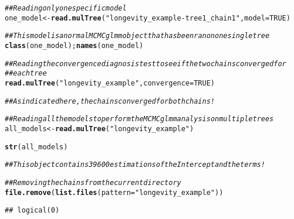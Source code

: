 \documentclass{article}\usepackage[]{graphicx}\usepackage[]{color}
\makeatletter
\newcommand{\hlnum}[1]{\textcolor[rgb]{0.686,0.059,0.569}{#1}}%
\newcommand{\hlstr}[1]{\textcolor[rgb]{0.192,0.494,0.8}{#1}}%
\newcommand{\hlcom}[1]{\textcolor[rgb]{0.678,0.584,0.686}{\textit{#1}}}%
\newcommand{\hlstd}[1]{\textcolor[rgb]{0.345,0.345,0.345}{#1}}%
\newcommand{\hlkwb}[1]{\textcolor[rgb]{0.69,0.353,0.396}{#1}}%
\newcommand{\hlkwc}[1]{\textcolor[rgb]{0.333,0.667,0.333}{#1}}%
\newcommand{\hlkwd}[1]{\textcolor[rgb]{0.737,0.353,0.396}{\textbf{#1}}}%
\newenvironment{kframe}{%
 \def\at@end@of@kframe{}%
 \ifinner\ifhmode%
  \def\at@end@of@kframe{\end{minipage}}%
  \begin{minipage}{\columnwidth}%
 \fi\fi%
 \def\FrameCommand##1{\hskip\@totalleftmargin \hskip-\fboxsep
 \colorbox{shadecolor}{##1}\hskip-\fboxsep
     \hskip-\linewidth \hskip-\@totalleftmargin \hskip\columnwidth}%
 \MakeFramed {\advance\hsize-\width
   \@totalleftmargin\z@ \linewidth\hsize
   \@setminipage}}%
 {\par\unskip\endMakeFramed%
 \at@end@of@kframe}
\newenvironment{knitrout}{}{} %
\makeatother
\begin{document}
\begin{knitrout}
\color{fgcolor}\begin{kframe}
\begin{alltt}
\hlcom{## Reading only one specific model}
\hlstd{one_model} \hlkwb{<-} \hlkwd{read.mulTree}\hlstd{(}\hlstr{"longevity_example-tree1_chain1"}\hlstd{,} \hlkwc{model} \hlstd{=} \hlnum{TRUE}\hlstd{)}
\end{alltt}


{\ttfamily\noindent\bfseries{}}\begin{alltt}
\hlcom{## This model is a normal MCMCglmm object that has been ran on one single tree}
\hlkwd{class}\hlstd{(one_model) ;} \hlkwd{names}\hlstd{(one_model)}
\end{alltt}


{\ttfamily\noindent\bfseries\color{errorcolor}{\#\# Error in eval(expr, envir, enclos): object 'one\_model' not found}}

{\ttfamily\noindent\bfseries\color{errorcolor}{\#\# Error in eval(expr, envir, enclos): object 'one\_model' not found}}\begin{alltt}
\hlcom{## Reading the convergence diagnosis test to see if the two chains converged for}
\hlcom{## each tree}
\hlkwd{read.mulTree}\hlstd{(}\hlstr{"longevity_example"}\hlstd{,} \hlkwc{convergence} \hlstd{=} \hlnum{TRUE}\hlstd{)}
\end{alltt}


{\ttfamily\noindent\bfseries{}}\begin{alltt}
\hlcom{## As indicated here, the chains converged for both chains!}

\hlcom{## Reading all the models to perform the MCMCglmm analysis on multiple trees}
\hlstd{all_models} \hlkwb{<-} \hlkwd{read.mulTree}\hlstd{(}\hlstr{"longevity_example"}\hlstd{)}
\end{alltt}


{\ttfamily\noindent\bfseries{}}\begin{alltt}
\hlkwd{str}\hlstd{(all_models)}
\end{alltt}


{\ttfamily\noindent\bfseries\color{errorcolor}{\#\# Error in str(all\_models): object 'all\_models' not found}}\begin{alltt}
\hlcom{## This object contains 39600 estimations of the Intercept and the terms!}

\hlcom{## Removing the chains from the current directory}
\hlkwd{file.remove}\hlstd{(}\hlkwd{list.files}\hlstd{(}\hlkwc{pattern}\hlstd{=}\hlstr{"longevity_example"}\hlstd{))}
\end{alltt}
\begin{verbatim}
## logical(0)
\end{verbatim}
\end{kframe}
\end{knitrout}
\end{document}
